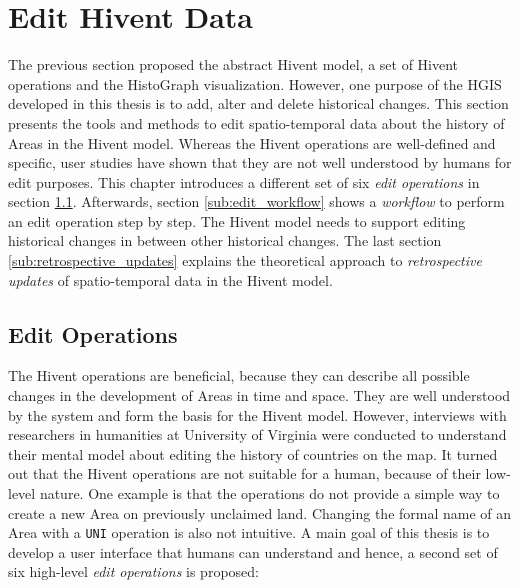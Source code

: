 
\section{Edit Hivent Data} %
\label{sec:editing_hivent_data}

The previous section proposed the abstract Hivent model, a set of Hivent operations and the HistoGraph visualization. However, one purpose of the HGIS developed in this thesis is to add, alter and delete historical changes. This section presents the tools and methods to edit spatio-temporal data about the history of Areas in the Hivent model. Whereas the Hivent operations are well-defined and specific, user studies have shown that they are not well understood by humans for edit purposes. This chapter introduces a different set of six \emph{edit operations} in section \ref{sub:edit_operations}. Afterwards, section \ref{sub:edit_workflow} shows a \emph{workflow} to perform an edit operation step by step. The Hivent model needs to support editing historical changes in between other historical changes. The last section \ref{sub:retrospective_updates} explains the theoretical approach to \emph{retrospective updates} of spatio-temporal data in the Hivent model.

\subsection{Edit Operations} %
\label{sub:edit_operations}

The Hivent operations are beneficial, because they can describe all possible changes in the development of Areas in time and space. They are well understood by the system and form the basis for the Hivent model. However, interviews with researchers in humanities at University of Virginia were conducted to understand their mental model about editing the history of countries on the map. It turned out that the Hivent operations are not suitable for a human, because of their low-level nature. One example is that the operations do not provide a simple way to create a new Area on previously unclaimed land. Changing the formal name of an Area with a \texttt{UNI} operation is also not intuitive. A main goal of this thesis is to develop a user interface that humans can understand and hence, a second set of six high-level \emph{edit operations} is proposed:

